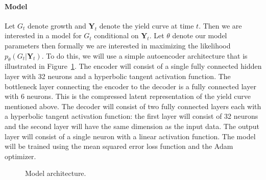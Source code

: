 \documentclass[
  letterpaper,
  DIV=11,
  numbers=noendperiod]{scrartcl}
\let\oldparagraph\paragraph
\renewcommand{\paragraph}[1]{\oldparagraph{#1}\mbox{}}
\theoremstyle{plain}
\theoremstyle{remark}
\begin{document}
\paragraph{Model}\label{model}

Let \(G_t\) denote growth and \(\mathbf{Y}_t\) denote the yield curve at
time \(t\). Then we are interested in a model for \(G_t\) conditional on
\(\mathbf{Y}_t\). Let \(\theta\) denote our model parameters then
formally we are interested in maximizing the likelihood
\(p_{\theta}(G_t|\mathbf{Y}_t)\). To do this, we will use a simple
autoencoder architecture that is illustrated in
Figure~\ref{fig-dl-model}. The encoder will consist of a single fully
connected hidden layer with 32 neurons and a hyperbolic tangent
activation function. The bottleneck layer connecting the encoder to the
decoder is a fully connected layer with 6 neurons. This is the
compressed latent representation of the yield curve mentioned above. The
decoder will consist of two fully connected layers each with a
hyperbolic tangent activation function: the first layer will consist of
32 neurons and the second layer will have the same dimension as the
input data. The output layer will consist of a single neuron with a
linear activation function. The model will be trained using the mean
squared error loss function and the Adam optimizer.

\begin{figure}


\caption{\label{fig-dl-model}Model architecture.}

\end{figure}%
\end{document}
